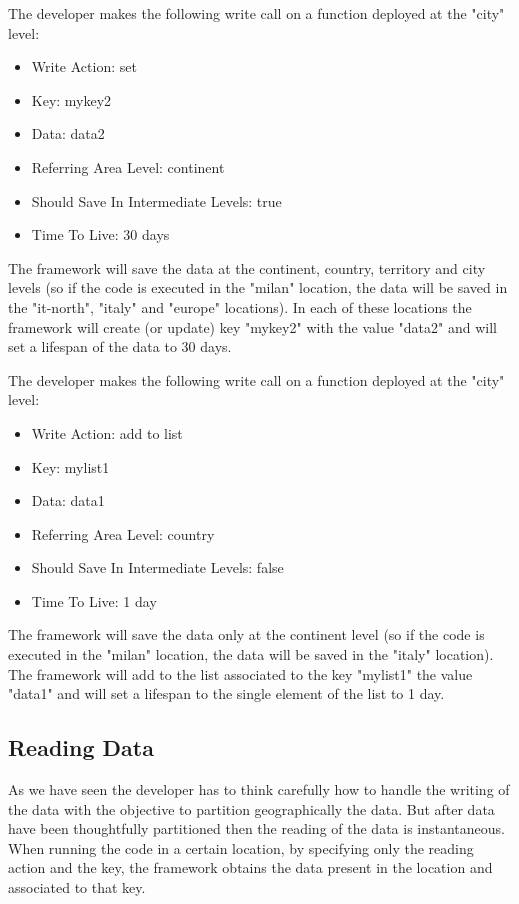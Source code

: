 \begin{example}
The developer makes the following write call on a function deployed at the "city" level:
\begin{itemize}
    \item Write Action: set
    \item Key: mykey2
    \item Data: data2
    \item Referring Area Level: continent
    \item Should Save In Intermediate Levels: true
    \item Time To Live: 30 days
\end{itemize}
The framework will save the data at the continent, country, territory and city levels (so if the code is executed in the "milan" location, the data will be saved in the "it-north", "italy" and "europe" locations). In each of these locations the framework will create (or update) key "mykey2" with the value "data2" and will set a lifespan of the data to 30 days.
\end{example}

\begin{example}
The developer makes the following write call on a function deployed at the "city" level:
\begin{itemize}
    \item Write Action: add to list
    \item Key: mylist1
    \item Data: data1
    \item Referring Area Level: country
    \item Should Save In Intermediate Levels: false
    \item Time To Live: 1 day
\end{itemize}
The framework will save the data only at the continent level (so if the code is executed in the "milan" location, the data will be saved in the "italy" location). The framework will add to the list associated to the key "mylist1" the value "data1" and will set a lifespan to the single element of the list to 1 day.
\end{example}


\subsection{Reading Data}
As we have seen the developer has to think carefully how to handle the writing of the data with the objective to partition geographically the data. But after data have been thoughtfully partitioned then the reading of the data is instantaneous.
When running the code in a certain location, by specifying only the reading action and the key, the framework obtains the data present in the location and associated to that key.

